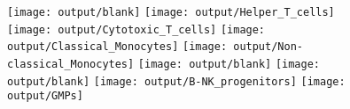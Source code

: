 \documentclass[11pt]{article}
\begin{document}
\begin{figure}[htbp]
  \centering
  \begin{minipage}[t]{0.125\textwidth}
    \centering
    \texttt{[image: output/blank]}
    \texttt{[image: output/Helper\_T\_cells]}
    \texttt{[image: output/Cytotoxic\_T\_cells]}
    \texttt{[image: output/Classical\_Monocytes]}
    \texttt{[image: output/Non-classical\_Monocytes]}
    \texttt{[image: output/blank]}
    \texttt{[image: output/blank]}
    \texttt{[image: output/B-NK\_progenitors]}
    \texttt{[image: output/GMPs]}


\end{minipage}
\end{figure}
\end{document}
